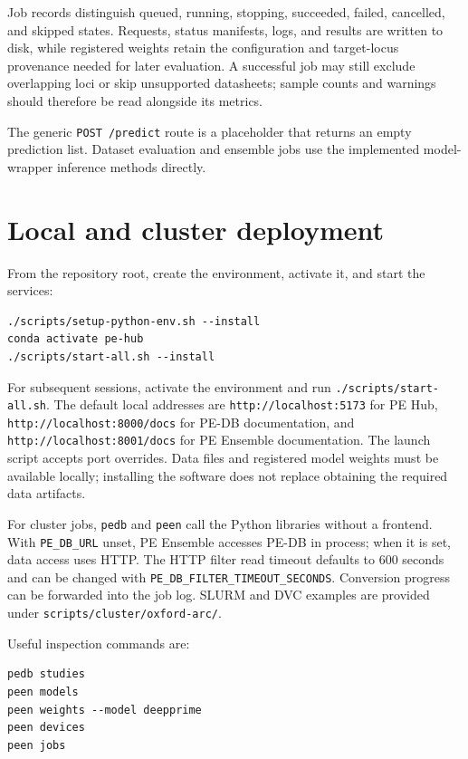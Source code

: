 \documentclass{article}
\begin{document}
Job records distinguish queued, running, stopping, succeeded, failed, cancelled, and skipped states. Requests, status manifests, logs, and results are written to disk, while registered weights retain the configuration and target-locus provenance needed for later evaluation. A successful job may still exclude overlapping loci or skip unsupported datasheets; sample counts and warnings should therefore be read alongside its metrics.

The generic \nolinkurl{POST /predict} route is a placeholder that returns an empty prediction list. Dataset evaluation and ensemble jobs use the implemented model-wrapper inference methods directly.

\section{Local and cluster deployment}
\label{app:deployment}

From the repository root, create the environment, activate it, and start the services:

\begin{verbatim}
./scripts/setup-python-env.sh --install
conda activate pe-hub
./scripts/start-all.sh --install
\end{verbatim}

For subsequent sessions, activate the environment and run \nolinkurl{./scripts/start-all.sh}. The default local addresses are \nolinkurl{http://localhost:5173} for PE Hub, \nolinkurl{http://localhost:8000/docs} for PE-DB documentation, and \nolinkurl{http://localhost:8001/docs} for PE Ensemble documentation. The launch script accepts port overrides. Data files and registered model weights must be available locally; installing the software does not replace obtaining the required data artifacts.

For cluster jobs, \nolinkurl{pedb} and \nolinkurl{peen} call the Python libraries without a frontend. With \nolinkurl{PE_DB_URL} unset, PE Ensemble accesses PE-DB in process; when it is set, data access uses HTTP. The HTTP filter read timeout defaults to 600 seconds and can be changed with \nolinkurl{PE_DB_FILTER_TIMEOUT_SECONDS}. Conversion progress can be forwarded into the job log. SLURM and DVC examples are provided under \nolinkurl{scripts/cluster/oxford-arc/}.

Useful inspection commands are:

\begin{verbatim}
pedb studies
peen models
peen weights --model deepprime
peen devices
peen jobs
\end{verbatim}
\end{document}
